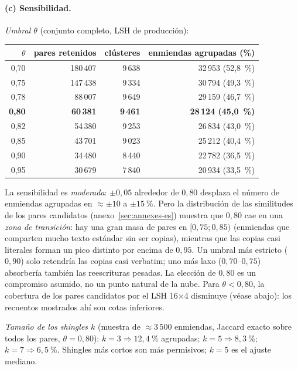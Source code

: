 \paragraph{(c) Sensibilidad.}
\emph{Umbral $\theta$} (conjunto completo, LSH de producción):
\begin{center}\small
\begin{tabular}{rrrr}
\toprule
$\theta$ & pares retenidos & clústeres & enmiendas agrupadas (\%) \\
\midrule
0,70 & 180\,407 & 9\,638 & 32\,953 \;(52,8~\%) \\
0,75 & 147\,438 & 9\,334 & 30\,794 \;(49,3~\%) \\
0,78 & \phantom{0}88\,007 & 9\,649 & 29\,159 \;(46,7~\%) \\
\textbf{0,80} & \phantom{0}\textbf{60\,381} & \textbf{9\,461} & \textbf{28\,124 \;(45,0~\%)} \\
0,82 & \phantom{0}54\,380 & 9\,253 & 26\,834 \;(43,0~\%) \\
0,85 & \phantom{0}43\,701 & 9\,023 & 25\,212 \;(40,4~\%) \\
0,90 & \phantom{0}34\,480 & 8\,440 & 22\,782 \;(36,5~\%) \\
0,95 & \phantom{0}30\,679 & 7\,840 & 20\,934 \;(33,5~\%) \\
\bottomrule
\end{tabular}
\end{center}
La sensibilidad es \emph{moderada}: $\pm0{,}05$ alrededor de $0{,}80$ desplaza el
número de enmiendas agrupadas en $\approx\pm10$ a $\pm15~\%$. Pero la distribución
de las similitudes de los pares candidatos (anexo~\ref{sec:annexes-es}) muestra que
$0{,}80$ cae en una \emph{zona de transición}: hay una gran masa de pares en
$[0{,}75;0{,}85)$ (enmiendas que comparten mucho texto estándar sin ser copias),
mientras que las copias casi literales forman un pico distinto por encima de
$0{,}95$. Un umbral más estricto ($0{,}90$) solo retendría las copias casi
verbatim; uno más laxo ($0{,}70$--$0{,}75$) absorbería también las reescrituras
pesadas. La elección de $0{,}80$ es un compromiso asumido, no un punto
\og{}natural\fg{} de la nube. Para $\theta<0{,}80$, la cobertura de los pares
candidatos por el LSH 16$\times$4 disminuye (véase abajo): los recuentos mostrados
ahí son cotas inferiores.

\emph{Tamaño de los shingles $k$} (muestra de $\approx 3\,500$ enmiendas, Jaccard
exacto sobre todos los pares, $\theta=0{,}80$): $k=3 \Rightarrow 12{,}4~\%$
agrupadas; $k=5 \Rightarrow 8{,}3~\%$; $k=7 \Rightarrow 6{,}5~\%$. Shingles más
cortos son más permisivos; $k=5$ es el ajuste mediano.

